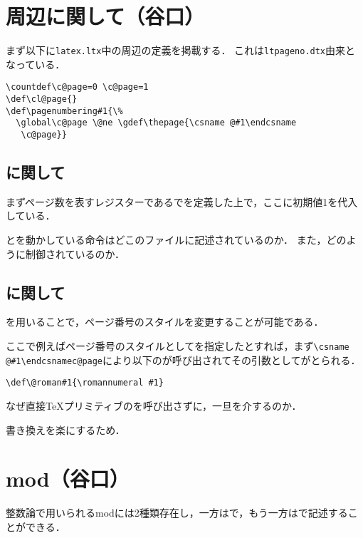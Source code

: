 \documentclass[autodetect-engine,dvipdfmx]{jsarticle}
\begin{document}
\section{周辺に関して（谷口）}
まず以下に\texttt{latex.ltx}中の周辺の定義を掲載する．
これは\texttt{ltpageno.dtx}由来となっている．

\latexltx
\begin{lstlisting}[firstnumber=3851]
\countdef\c@page=0 \c@page=1
\def\cl@page{}
\def\pagenumbering#1{\%
  \global\c@page \@ne \gdef\thepage{\csname @#1\endcsname
   \c@page}}
\end{lstlisting}

\subsection{に関して}
まずページ数を表すレジスターであるでを定義した上で，ここに初期値1を代入している．

\begin{question}
とを動かしている命令はどこのファイルに記述されているのか．
また，どのように制御されているのか． %
\end{question}

\subsection{に関して}
を用いることで，ページ番号のスタイルを変更することが可能である．

ここで例えばページ番号のスタイルとしてを指定したとすれば，まず\verb|\csname @#1\endcsnamec@page|により以下のが呼び出されてその引数としてがとられる．

\begin{lstlisting}[firstnumber=1850]
\def\@roman#1{\romannumeral #1}
\end{lstlisting}

\begin{question}
なぜ直接\TeX プリミティブのを呼び出さずに，一旦を介するのか．
\end{question}
\begin{answer}
書き換えを楽にするため．
\end{answer}


\section{mod（谷口）}
整数論で用いられるmodには2種類存在し，一方はで，もう一方はで記述することができる．
\end{document}
